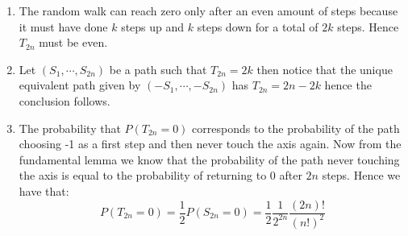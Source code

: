 \documentclass[10pt,a4paper]{article}
\begin{document}
\begin{enumerate}

\item The random walk can reach zero only after an even amount of steps because it must have done $k$ steps up and $k$ steps down for a total of $2k$ steps. Hence $T_{2n}$ must be even.

\item Let $(S_1, \cdots, S_{2n})$ be a path such that $T_{2n} = 2k$ then notice that the unique equivalent path given by $(-S_1, \cdots, -S_{2n})$ has $T_{2n} = 2n - 2k$ hence the conclusion follows.

\item The probability that $P(T_{2n} = 0)$ corresponds to the probability of the path choosing -1 as a first step and then never touch the axis again. Now from the fundamental lemma we know that the probability of the path never touching the axis is equal to the probability of returning to 0 after $2n$ steps. Hence we have that:
\[
P(T_{2n} = 0) = \frac{1}{2} P(S_{2n} = 0) = \frac{1}{2} \frac{1}{2^{2n}} \frac{(2n)!}{(n!)^2}
\] 


\end{enumerate}
\end{document}
